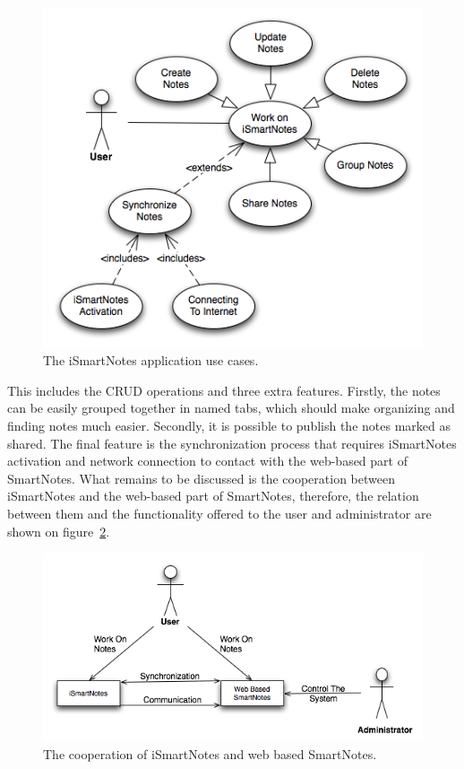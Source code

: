 \begin{figure}[ht]
\begin{center}
\includegraphics[scale=0.5]{charts/work_on_iSmartNotes.png}
\caption{The iSmartNotes application use cases.}
\label{fig:workon_ismartnotes}
\end{center}
\end{figure}
This includes the CRUD operations and three extra features. Firstly, the notes can be easily grouped together in named tabs, which should make organizing and finding notes much easier. Secondly, it is possible to publish the notes marked as shared. The final feature is the synchronization process that requires iSmartNotes activation and network connection to contact with the web-based part of SmartNotes. What remains to be discussed is the cooperation between iSmartNotes and the web-based part of SmartNotes, therefore, the relation between them and the functionality offered to the user and administrator are shown on figure~\ref{fig:ismartnotes_smartnotes}. 
\begin{figure}[ht]
\begin{center}
\includegraphics[scale=0.5]{charts/iSmartNotes_SmartNotes.png}
\caption{The cooperation of iSmartNotes and web based SmartNotes.}
\label{fig:ismartnotes_smartnotes}
\end{center}
\end{figure}

